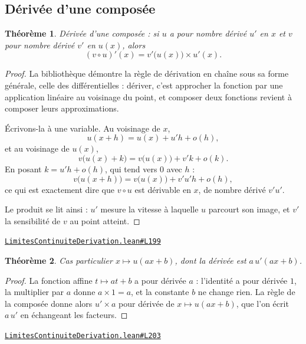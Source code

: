 \documentclass[11pt,a4paper]{article}
\theoremstyle{definition}
\theoremstyle{plain}
\newtheorem{theoreme}{Théorème}
\newcommand{\source}[2]{\par\smallskip\noindent\hfill{\footnotesize\href{#1}{\texttt{#2}}}\par\smallskip}
\begin{document}
\subsection{Dérivée d'une composée}

\begin{theoreme}
Dérivée d'une composée : si $u$ a pour nombre dérivé $u'$ en $x$ et $v$ pour nombre
dérivé $v'$ en $u(x)$, alors
\[ (v \circ u)'(x) = v'\bigl(u(x)\bigr) \times u'(x) . \]
\end{theoreme}

\begin{proof}
La bibliothèque démontre la règle de dérivation en chaîne sous sa forme générale, celle des
différentielles : dériver, c'est approcher la fonction par une application linéaire au
voisinage du point, et composer deux fonctions revient à composer leurs approximations.

Écrivons-la à une variable. Au voisinage de $x$,
\[ u(x + h) = u(x) + u'h + o(h) , \]
et au voisinage de $u(x)$,
\[ v\bigl(u(x) + k\bigr) = v\bigl(u(x)\bigr) + v'k + o(k) . \]
En posant $k = u'h + o(h)$, qui tend vers $0$ avec $h$ :
\[ v\bigl(u(x + h)\bigr) = v\bigl(u(x)\bigr) + v'u'h + o(h) , \]
ce qui est exactement dire que $v \circ u$ est dérivable en $x$, de nombre dérivé $v'u'$.

Le produit se lit ainsi : $u'$ mesure la vitesse à laquelle $u$ parcourt son image, et $v'$
la sensibilité de $v$ au point atteint.
\end{proof}
\source{https://github.com/Commutator-IO/learn-lean/blob/main/courses/02-lycee/04-limites-continuite-derivation/LimitesContinuiteDerivation.lean\#L199}{LimitesContinuiteDerivation.lean\#L199}

\begin{theoreme}
Cas particulier $x \mapsto u(ax + b)$, dont la dérivée est $a\,u'(ax + b)$.
\end{theoreme}

\begin{proof}
La fonction affine $t \mapsto at + b$ a pour dérivée $a$ : l'identité a pour dérivée $1$,
la multiplier par $a$ donne $a \times 1 = a$, et la constante $b$ ne change rien. La règle
de la composée donne alors $u' \times a$ pour dérivée de $x \mapsto u(ax + b)$, que l'on
écrit $a\,u'$ en échangeant les facteurs.
\end{proof}
\source{https://github.com/Commutator-IO/learn-lean/blob/main/courses/02-lycee/04-limites-continuite-derivation/LimitesContinuiteDerivation.lean\#L203}{LimitesContinuiteDerivation.lean\#L203}
\end{document}
